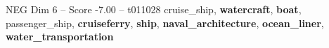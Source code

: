 \begin{textsample}{NEG Dim 6 – Score -7.00 – t011028}  \label{ex:f6_neg_021}
cruise\_ship, \textbf{watercraft}, \textbf{boat}, passenger\_ship, \textbf{cruiseferry}, \textbf{ship}, \textbf{naval\_architecture}, \textbf{ocean\_liner}, \textbf{water\_transportation}

\end{textsample}

